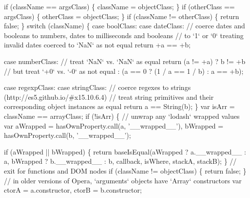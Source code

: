 \begin{DoxyCodeInclude}
      \textcolor{keywordflow}{if} (className == argsClass) \{
        className = objectClass;
      \}
      \textcolor{keywordflow}{if} (otherClass == argsClass) \{
        otherClass = objectClass;
      \}
      \textcolor{keywordflow}{if} (className != otherClass) \{
        \textcolor{keywordflow}{return} \textcolor{keyword}{false};
      \}
      \textcolor{keywordflow}{switch} (className) \{
        \textcolor{keywordflow}{case} boolClass:
        \textcolor{keywordflow}{case} dateClass:
          \textcolor{comment}{// coerce dates and booleans to numbers, dates to milliseconds and booleans}
          \textcolor{comment}{// to `1` or `0` treating invalid dates coerced to `NaN` as not equal}
          \textcolor{keywordflow}{return} +a == +b;

        \textcolor{keywordflow}{case} numberClass:
          \textcolor{comment}{// treat `NaN` vs. `NaN` as equal}
          \textcolor{keywordflow}{return} (a != +a)
            ? b != +b
            \textcolor{comment}{// but treat `+0` vs. `-0` as not equal}
            : (a == 0 ? (1 / a == 1 / b) : a == +b);

        \textcolor{keywordflow}{case} regexpClass:
        \textcolor{keywordflow}{case} stringClass:
          \textcolor{comment}{// coerce regexes to strings (http://es5.github.io/#x15.10.6.4)}
          \textcolor{comment}{// treat string primitives and their corresponding object instances as equal}
          \textcolor{keywordflow}{return} a == String(b);
      \}
      var isArr = className == arrayClass;
      \textcolor{keywordflow}{if} (!isArr) \{
        \textcolor{comment}{// unwrap any `lodash` wrapped values}
        var aWrapped = hasOwnProperty.call(a, \textcolor{stringliteral}{'\_\_wrapped\_\_'}),
            bWrapped = hasOwnProperty.call(b, \textcolor{stringliteral}{'\_\_wrapped\_\_'});

        \textcolor{keywordflow}{if} (aWrapped || bWrapped) \{
          \textcolor{keywordflow}{return} baseIsEqual(aWrapped ? a.\_\_wrapped\_\_ : a, bWrapped ? b.\_\_wrapped\_\_ : b, callback, isWhere,
       stackA, stackB);
        \}
        \textcolor{comment}{// exit for functions and DOM nodes}
        \textcolor{keywordflow}{if} (className != objectClass) \{
          \textcolor{keywordflow}{return} \textcolor{keyword}{false};
        \}
        \textcolor{comment}{// in older versions of Opera, `arguments` objects have `Array` constructors}
        var ctorA = a.constructor,
            ctorB = b.constructor;


\end{DoxyCodeInclude}
